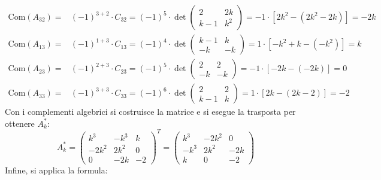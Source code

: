 \documentclass[a4paper]{article}
\begin{document}
\begin{equation*}
\begin{array}{ll}
			\mathrm{Com}\left(A_{32}\right) = & \left(-1\right)^{3+2} \cdot C_{32} = \left(-1\right)^{5} \cdot \det\begin{pmatrix}
				2   & 2k	\\
				k-1 & k^{2}
			\end{pmatrix} = -1 \cdot \left[2k^{2} - \left(2k^{2} - 2k\right)\right] = -2k\\ [1.2em]
			
			\mathrm{Com}\left(A_{13}\right) = & \left(-1\right)^{1+3} \cdot C_{13} = \left(-1\right)^{4} \cdot \det\begin{pmatrix}
				k-1 & k \\
				-k  & -k
			\end{pmatrix} = 1 \cdot \left[-k^{2} + k - \left(-k^{2}\right)\right] = k \\ [1.2em]
			
			\mathrm{Com}\left(A_{23}\right) = & \left(-1\right)^{2+3} \cdot C_{23} = \left(-1\right)^{5} \cdot \det\begin{pmatrix}
				2  & 2 \\
				-k & -k
			\end{pmatrix} = -1 \cdot \left[-2k - \left(-2k\right)\right] = 0 \\ [1.2em]
			
			\mathrm{Com}\left(A_{33}\right) = & \left(-1\right)^{3+3} \cdot C_{33} = \left(-1\right)^{6} \cdot \det\begin{pmatrix}
				2   & 2 \\
				k-1 & k
			\end{pmatrix} = 1 \cdot \left[2k - \left(2k - 2\right)\right] = -2
		\end{array}
	\end{equation*}
	Con i complementi algebrici si costruisce la matrice e si esegue la trasposta per ottenere $A_{k}^{*}$:
	\begin{equation*}
		A_{k}^{*} = \begin{pmatrix}
			k^{3}	& -k^{3}	& k \\
			-2k^{2} & 2k^{2}	& 0 \\
			0		& -2k		& -2
		\end{pmatrix}^{T} = \begin{pmatrix}
			k^{3} 	& -2k^{2} 	& 0 \\
			-k^{3}	& 2k^{2}	& -2k \\
			k		& 0			& -2
		\end{pmatrix}
	\end{equation*}
	Infine, si applica la formula:
\end{document}
